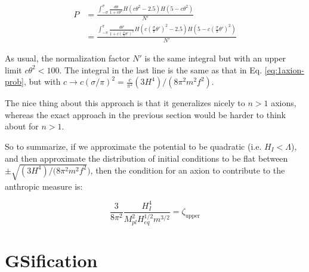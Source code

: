 \documentclass{article}
\begin{document}
\begin{align*}
    \label{eq:approx-inf-prob}
    P & = \frac{\int_{-\sigma}^{\sigma}\frac{d\theta}{1+c\theta^2}H(c\theta^2-2.5)H(5-c\theta^2)}{N'} \\
    & = \frac{\int_{-\pi}^{\pi}\frac{d\theta'}{1+c(\frac{\sigma}{\pi}\theta')^2}H(c(\frac{\sigma}{\pi}\theta')^2-2.5)H(5-c(\frac{\sigma}{\pi}\theta')^2)}{N'}
\end{align*}

\noindent As usual, the normalization factor $N'$ is the same integral but with an upper limit $c\theta^2<100$. The integral in the last line is the same as that in Eq. \eqref{eq:1axion-prob}, but with $c\rightarrow c(\sigma/\pi)^2 = \frac{c}{\pi^2}(3H^4)/(8\pi^2m^2f^2)$. 

The nice thing about this approach is that it generalizes nicely to $n>1$ axions, whereas the exact approach in the previous section would be harder to think about for $n>1$.

So to summarize, if we approximate the potential to be quadratic (i.e. $H_I<\Lambda$), and then approximate the distribution of initial conditions to be flat between $\pm \sqrt{(3H^4)/(8\pi^2m^2f^2})$, then the condition for an axion to contribute to the anthropic measure is:

\begin{equation}
    \boxed{\frac{3}{8\pi^2}\frac{H_I^4}{M_{pl}^2H_{eq}^{1/2}m^{3/2}}=\zeta_\text{upper}}
\end{equation}

\section{GSification}

\appendix
\end{document}
